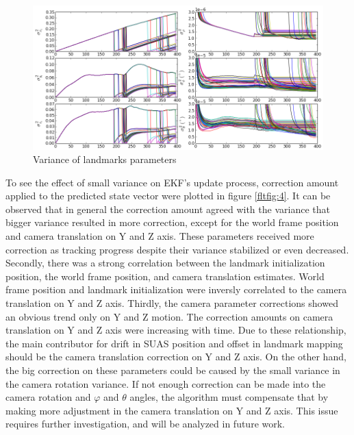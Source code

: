 \begin{figure}[h]
\centering
\includegraphics[width=14cm, keepaspectratio=true]
{./Figures/fltfig/cut1/Figure40.png}
\caption{Variance of landmarks parameters}
\label{fltfig:3}
\end{figure}
\FloatBarrier

To see the effect of small variance on EKF's update process, correction
amount applied to the predicted state vector were plotted in figure
\ref{fltfig:4}. It can be observed that in general the correction
amount agreed with the variance that bigger variance resulted in more
correction, except for the world frame position and camera translation
on Y and Z axis. These parameters received more correction as tracking
progress despite their variance stabilized or even decreased.
Secondly, there was a strong correlation between the landmark
initialization position, the world frame position, and camera
translation estimates. World frame position and landmark
initialization were inversly correlated to the camera translation on Y
and Z axis. Thirdly, the camera parameter corrections showed an
obvious trend only on Y and Z motion. The correction amounts on camera
translation on Y and Z axis were increasing with time. Due to these
relationship, the main contributor for drift in SUAS position and
offset in landmark mapping should be the camera translation correction
on Y and Z axis. On the other hand, the big correction on these
parameters could be caused by the small variance in the camera
rotation variance. If not enough correction can be made into the
camera rotation and $\varphi$ and $\theta$ angles, the algorithm must
compensate that by making more adjustment in the camera translation on Y
and Z axis. This issue requires further investigation, and will be analyzed
in future work.

